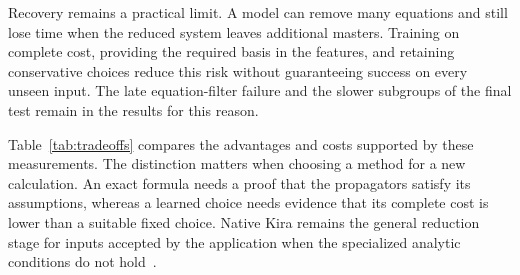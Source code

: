 Recovery remains a practical limit. A model can remove many equations and still lose time when the reduced system leaves additional masters. Training on complete cost, providing the required basis in the features, and retaining conservative choices reduce this risk without guaranteeing success on every unseen input. The late equation-filter failure and the slower subgroups of the final test remain in the results for this reason.

Table~\ref{tab:tradeoffs} compares the advantages and costs supported by these measurements. The distinction matters when choosing a method for a new calculation. An exact formula needs a proof that the propagators satisfy its assumptions, whereas a learned choice needs evidence that its complete cost is lower than a suitable fixed choice. Native Kira remains the general reduction stage for inputs accepted by the application when the specialized analytic conditions do not hold~\cite{KiraOriginal,Kira3}.
